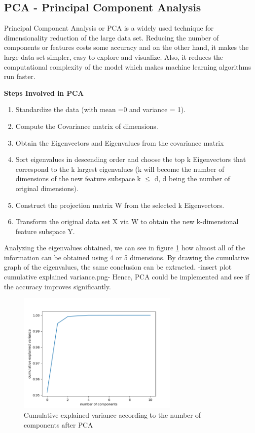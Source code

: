 \documentclass[twoside,a4paper,12pt]{report}
\begin{document}
\subsection{PCA - Principal Component Analysis}

Principal Component Analysis or PCA is a widely used technique for dimensionality 
reduction of the large data set. Reducing the number of components or features costs
 some accuracy and on the other hand, it makes the large data set simpler, easy to 
 explore and visualize. Also, it reduces the computational complexity of the model 
 which makes machine learning algorithms run faster.

\textbf{Steps Involved in PCA}
\begin{enumerate}
    \item Standardize the data (with mean =0 and variance = 1).
    \item Compute the Covariance matrix of dimensions.
    \item Obtain the Eigenvectors and Eigenvalues from the covariance matrix
    \item Sort eigenvalues in descending order and choose the top k Eigenvectors 
    that correspond to the k largest eigenvalues (k will become the number of 
    dimensions of the new feature subspace k $\leq$ d, d being the number of original dimensions).
    \item Construct the projection matrix W from the selected k Eigenvectors.
    \item Transform the original data set X via W to obtain the new k-dimensional feature subspace Y.
\end{enumerate}

Analyzing the eigenvalues obtained,  we can see in figure \ref{PCAChosenComponents} how almost all of the information
can be obtained using 4 or 5 dimensions.
By drawing the cumulative graph of the eigenvalues, the same conclusion can be extracted.
 -insert plot cumulative explained variance.png-
Hence, PCA could be implemented and see if the accuracy improves significantly.
\begin{figure}[H]
    \centering
    \includegraphics[width=0.7\textwidth,height=0.4\textheight]{cumulative_explained_variance.png}
    \caption{Cumulative explained variance according to the number of components after PCA     \label{PCAChosenComponents} 
    }
\end{figure}
\end{document}
